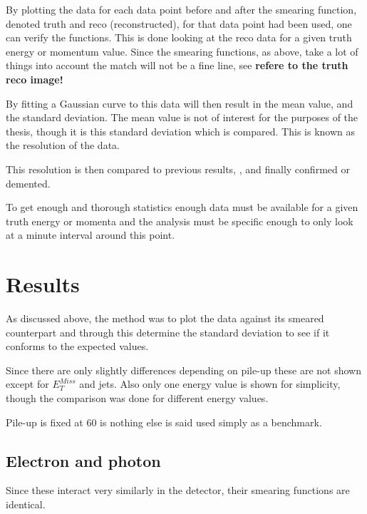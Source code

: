 By plotting the data for each data point before and after the smearing function, denoted truth and reco (reconstructed), for that data point had been used, one can verify the functions. This is done looking at the reco data for a given truth energy or momentum value. Since the smearing functions, as above, take a lot of things into account the match will not be a fine line, see \textbf{refere to the truth reco image!}

By fitting a Gaussian curve to this data will then result in the mean value, and the standard deviation. The mean value is not of interest for the purposes of the thesis, though it is this standard deviation which is compared. This is known as the resolution of the data.

This resolution is then compared to previous results, \citep{ATL-PHYS-PUB-2013-004}, and finally confirmed or demented.

To get enough and thorough statistics enough data must be available for a given truth energy or momenta and the analysis must be specific enough to only look at a minute interval around this point.
\newpage
\section{Results}\label{cha:vali:sec:results}
As discussed above, the method was to plot the data against its smeared counterpart and through this determine the standard deviation to see if it conforms to the expected values.

Since there are only slightly differences depending on pile-up these are not shown except for $E_T^{Miss}$ and jets. Also only one energy value is shown for simplicity, though the comparison was done for different energy values.

Pile-up is fixed at 60 is nothing else is said used simply as a benchmark.
\subsection{Electron and photon}
Since these interact very  similarly in the detector, their smearing functions are identical.

